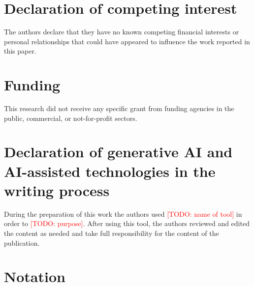 \documentclass[preprint,12pt,number]{elsarticle}%
\theoremstyle{definition}
\theoremstyle{remark}
\newcommand{\todo}[1]{\textcolor{red}{[TODO: #1]}}
\begin{document}
\section*{Declaration of competing interest}
The authors declare that they have no known competing financial interests or personal relationships that could have appeared to influence the work reported in this paper.

\section*{Funding}
This research did not receive any specific grant from funding agencies in the public, commercial, or not-for-profit sectors.

\section*{Declaration of generative AI and AI-assisted technologies in the writing process}
During the preparation of this work the authors used \todo{name of tool} in order to \todo{purpose}. After using this tool, the authors reviewed and edited the content as needed and take full responsibility for the content of the publication.

\appendix
\section{Notation}\label{app:notation}
\end{document}
